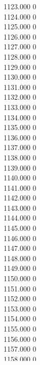 { 1123.000	0 \\
 1124.000	0 \\
 1125.000	0 \\
 1126.000	0 \\
 1127.000	0 \\
 1128.000	0 \\
 1129.000	0 \\
 1130.000	0 \\
 1131.000	0 \\
 1132.000	0 \\
 1133.000	0 \\
 1134.000	0 \\
 1135.000	0 \\
 1136.000	0 \\
 1137.000	0 \\
 1138.000	0 \\
 1139.000	0 \\
 1140.000	0 \\
 1141.000	0 \\
 1142.000	0 \\
 1143.000	0 \\
 1144.000	0 \\
 1145.000	0 \\
 1146.000	0 \\
 1147.000	0 \\
 1148.000	0 \\
 1149.000	0 \\
 1150.000	0 \\
 1151.000	0 \\
 1152.000	0 \\
 1153.000	0 \\
 1154.000	0 \\
 1155.000	0 \\
 1156.000	0 \\
 1157.000	0 \\
 1158.000	0 \\
 1159.000	0 \\
 1160.000	0 \\
 1161.000	0 \\
 1162.000	0 \\
 1163.000	0 \\
 1164.000	0 \\
 1165.000	0 \\
 1166.000	0 \\
 1167.000	0 \\
 1168.000	0 \\
 1169.000	0 \\
 1170.000	0 \\
}

